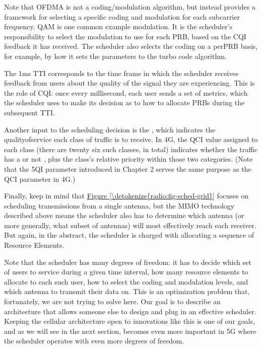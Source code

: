 \documentclass[a4paper,11pt,english]{sphinxmanual}
\begin{document}
\sphinxAtStartPar
Note that OFDMA is not a coding/modulation algorithm, but instead
provides a framework for selecting a specific coding and modulation for
each subcarrier frequency. QAM is one common example modulation. It is
the scheduler’s responsibility to select the modulation to use for each
PRB, based on the CQI feedback it has received. The scheduler also
selects the coding on a per\sphinxhyphen{}PRB basis, for example, by how it sets the
parameters to the turbo code algorithm.

\sphinxAtStartPar
The 1\sphinxhyphen{}ms TTI corresponds to the time frame in which the scheduler
receives feedback from users about the quality of the signal they are
experiencing. This is the role of CQI: once every
millisecond, each user sends a set of metrics, which the scheduler uses
to make its decision as to how to allocate PRBs during the subsequent
TTI.

\sphinxAtStartPar
Another input to the scheduling decision is the , which indicates the quality\sphinxhyphen{}of\sphinxhyphen{}service each class of traffic
is to receive. In 4G, the QCI value assigned to each class (there are
twenty six such classes, in total) indicates whether the traffic has
a  or not , plus the class’s
relative priority within those two categories. (Note that the 5QI
parameter introduced in Chapter 2 serves the same purpose as the
QCI parameter in 4G.)

\sphinxAtStartPar
Finally, keep in mind that \hyperref[\detokenize{radio:fig-sched-grid}]{Figure \ref{\detokenize{radio:fig-sched-grid}}} focuses on
scheduling transmissions from a single antenna, but the MIMO technology
described above means the scheduler also has to determine which antenna
(or more generally, what subset of antennas) will most effectively reach
each receiver. But again, in the abstract, the scheduler is charged with
allocating a sequence of Resource Elements.

\sphinxAtStartPar
Note that the scheduler has many degrees of freedom: it has to decide which
set of users to service during a given time interval, how many resource
elements to allocate to each such user, how to select the coding and
modulation levels, and which antenna to transmit their data on. This is
an optimization problem that, fortunately, we are not trying to solve
here. Our goal is to describe an architecture that allows someone else
to design and plug in an effective scheduler. Keeping the cellular
architecture open to innovations like this is one of our goals, and as
we will see in the next section, becomes even more important in 5G where
the scheduler operates with even more degrees of freedom.
\end{document}
